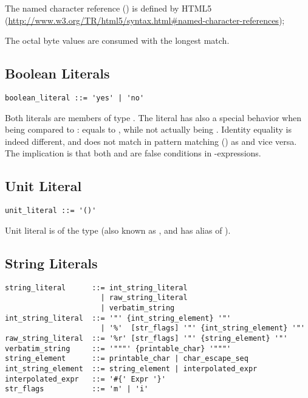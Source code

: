 The named character reference () is defined by HTML5 (\url{http://www.w3.org/TR/html5/syntax.html#named-character-references});

The octal byte values are consumed with the longest match. 






\subsection{Boolean Literals}
\label{sec:booleanliterals}

\syntax\begin{lstlisting}
boolean_literal ::= 'yes' | 'no'
\end{lstlisting}

Both literals are members of type \lstinline@Boolean@. The \lstinline@no@ literal has also a special behavior when being compared to \lstinline@nil@: \lstinline@no@ equals to \lstinline@nil@, while not actually being \lstinline@nil@. Identity equality is indeed different, and  does not match in pattern matching () as  and vice versa. The implication is that both \lstinline@nil@ and \lstinline@no@ are false conditions in \lstinline@if@-expressions. 




\subsection{Unit Literal}
\label{sec:unit-literal}

\syntax\begin{lstlisting}
unit_literal ::= '()'
\end{lstlisting}

Unit literal is of the type  (also known as , and has alias of ).





\subsection{String Literals}
\label{sec:stringliterals}

\syntax\begin{lstlisting}
string_literal      ::= int_string_literal
                      | raw_string_literal
                      | verbatim_string
int_string_literal  ::= '"' {int_string_element} '"'
                      | '%'  [str_flags] '"' {int_string_element} '"'
raw_string_literal  ::= '%r' [str_flags] '"' {string_element} '"'
verbatim_string     ::= '"""' {printable_char} '"""'
string_element      ::= printable_char | char_escape_seq
int_string_element  ::= string_element | interpolated_expr
interpolated_expr   ::= '#{' Expr '}'
str_flags           ::= 'm' | 'i'
\end{lstlisting}

